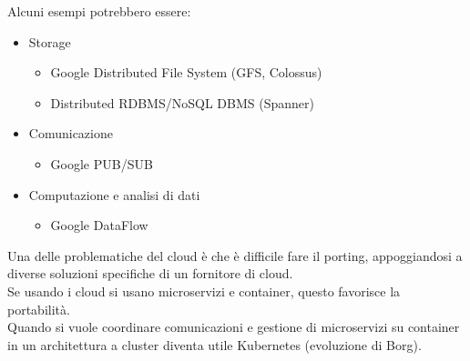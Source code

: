 Alcuni esempi potrebbero essere:
\begin{itemize}
    \item Storage 
    \begin{itemize}
        \item Google Distributed File System (GFS, Colossus)
        \item Distributed RDBMS/NoSQL DBMS (Spanner)
    \end{itemize}
    \item Comunicazione
    \begin{itemize}
        \item Google PUB/SUB
    \end{itemize}
    \item Computazione e analisi di dati
    \begin{itemize}
        \item Google DataFlow
    \end{itemize}
\end{itemize}

Una delle problematiche del cloud è che è difficile fare il porting, appoggiandosi a diverse soluzioni specifiche di un fornitore di cloud. \\
Se usando i cloud si usano microservizi e container, questo favorisce la portabilità. \\
Quando si vuole coordinare comunicazioni e gestione di microservizi su container in un architettura a cluster diventa utile Kubernetes (evoluzione di Borg).





